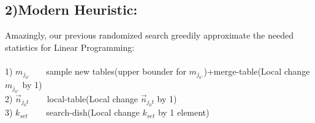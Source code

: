 \documentclass{article}
\begin{document}
\begin{spacing}{1.1}
\section{2)Modern Heuristic:}
Amazingly, our previous randomized search greedily approximate the needed statistics for Linear Programming:\\ \\
1) $m_{j_{0}.}\ \ \ \ \ \ \ $   sample new tables(upper bounder for $m_{j_{0}.}$)+merge-table(Local change $m_{j_{0}.}$ by 1)\\ 
2) $\vec n_{j_{0}t}\ \ \ \ \ \ \ \ $    local-table(Local change $\vec n_{j_{0}t}$ by 1)\\
3) $k_{set}\ \ \ \ \ \ \ \ $     search-dish(Local change $k_{set}$ by 1 element)\\ \\
\end{spacing}
\end{document}
